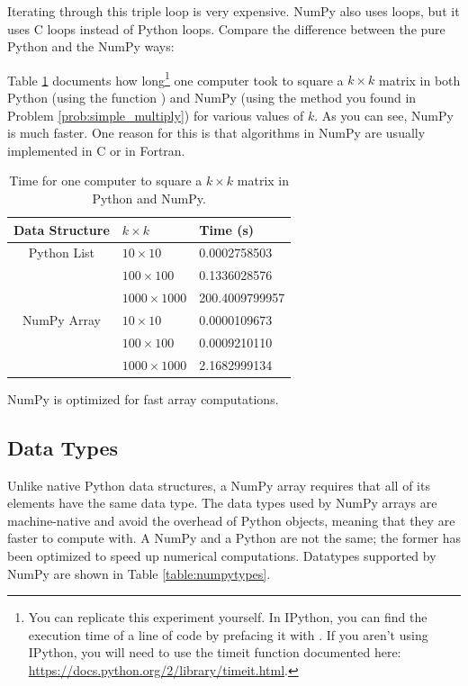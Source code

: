 

Iterating through this triple  loop is very expensive.
NumPy also uses loops, but it uses C loops instead of Python loops.
Compare the difference between the pure Python and the NumPy ways:

% 

Table \ref{table:square_times} documents how long\footnote{You can replicate this experiment yourself. In IPython, you can find the execution time of a line of code by prefacing it with . 
If you aren't using IPython, you will need
to use the timeit function documented here: \url{https://docs.python.org/2/library/timeit.html}.} 
one computer took to square a $k \times k$ matrix in both Python (using the function ) and NumPy (using the method you found in Problem \ref{prob:simple_multiply}) for various values of $k$. 
As you can see, NumPy is much faster.
One reason for this is that algorithms in NumPy are usually implemented in C or in Fortran. 

\begin{table}
 \begin{tabular}{|c|l|l|} \hline Data Structure & $k\times k$ & Time (s) \\ \hline 
 Python List    & $10\times10$  & 0.0002758503 \\ 
 \cline{2-3}    & $100\times100$    & 0.1336028576 \\ 
 \cline{2-3}    & $1000\times1000$ & 200.4009799957 \\ 
\hline \hline 
 NumPy Array    & $10\times10$  & 0.0000109673 \\
 \cline{2-3}    & $100\times100$    & 0.0009210110 \\ 
 \cline{2-3}    & $1000\times1000$ & 2.1682999134 \\
 \hline \end{tabular}
 \caption{Time for one computer to square a $k \times k$ matrix in Python and NumPy.}
\label{table:square_times} 
\end{table} 
% 

NumPy is optimized for fast array computations.



\subsection*{Data Types}
Unlike native Python data structures, a NumPy array requires that all of its elements have the same data type. 
The data types used by NumPy arrays are machine-native and avoid the overhead of Python objects, meaning that they are faster to compute with.
A NumPy  and a Python  are not the same; the former has been optimized to speed up numerical computations. 
Datatypes supported by NumPy are shown in Table \ref{table:numpytypes}.


